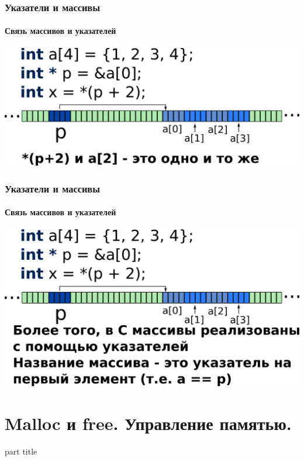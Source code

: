 \documentclass[14pt,pdf,hyperref={unicode}]{beamer}
\begin{document}
\begin{frame}[fragile]
\frametitle{Указатели и массивы} 
\framesubtitle{Связь массивов и указателей}
\begin{center}
\includegraphics[width=0.95\linewidth]{images/memory_parrays_4.png}
\end{center}
\end{frame}

\begin{frame}[fragile]
\frametitle{Указатели и массивы} 
\framesubtitle{Связь массивов и указателей}
\begin{center}
\includegraphics[width=0.95\linewidth]{images/memory_parrays_5.png}
\end{center}
\end{frame}





\section{Malloc и free. Управление памятью.}
\begin{frame}
\begin{center}
\begin{beamercolorbox}[sep=8pt,center]{part
title}
\insertsection
\end{beamercolorbox}
\end{center}
\end{frame}
\end{document}
